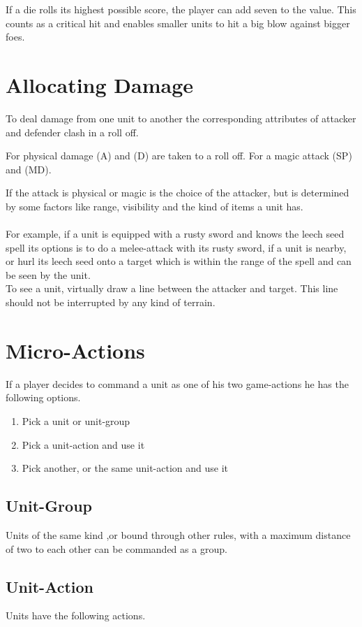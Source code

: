 \documentclass[a5paper,pagesize,10pt,bibtotoc,pointlessnumbers,
normalheadings,DIV=9,twoside=false]{scrbook}
\begin{document}
If a die rolls its highest possible score, the player can add seven to the value. This counts as a critical hit and enables smaller units to hit a big blow against bigger foes.

\section{Allocating Damage}
To deal damage from one unit to another the corresponding attributes of attacker and defender clash in a roll off.

For physical damage (A) and (D) are taken to a roll off. For a magic attack (SP) and (MD).

If the attack is physical or magic is the choice of the attacker, but is determined by some factors like range, visibility and the kind of items a unit has.\\
\\
For example, if a unit is equipped with a rusty sword and knows the leech seed spell its options is to do a melee-attack with its rusty sword, if a unit is nearby, or hurl its leech seed onto a target which is within the range of the spell and can be seen by the unit.\\
To see a unit, virtually draw a line between the attacker and target. This line should not be interrupted by any kind of terrain.

\section{Micro-Actions}
If a player decides to command a unit as one of his two game-actions he has the following options.

\begin{enumerate}
\item Pick a unit or unit-group
\item Pick a unit-action and use it
\item Pick another, or the same unit-action and use it
\end{enumerate}

\subsection{Unit-Group}
Units of the same kind ,or bound through other rules, with a maximum distance of two to each other can be commanded as a group.

\subsection{Unit-Action}
Units have the following actions.
\end{document}
